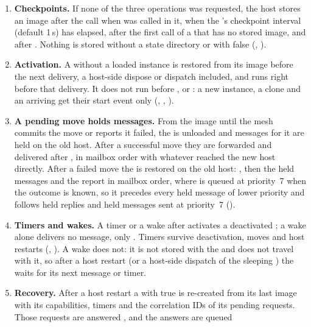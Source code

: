 \begin{enumerate}[leftmargin=2em]
  Images are taken only
  between calls, never while a call runs (; ABI
  section~4).
\item \textbf{Checkpoints.} If none of the three operations was requested,
  the host stores an image after the call when  was called
  in it, when the \paglet{}'s checkpoint interval (default 1\,s) has
  elapsed, after the first call of a \paglet{} that has no stored image,
  and after . Nothing is stored without a state
  directory or with  false (,
  ).
\item \textbf{Activation.} A \paglet{} without a loaded instance is restored
  from its image before the next delivery, a host-side dispose or dispatch
  included, and  runs right before that delivery. It
  does not run before ,  or : a new
  instance, a clone and an arriving \paglet{} get their start event only
  (, , ).
\item \textbf{A pending move holds messages.} From the image until the
  mesh commits the move or reports it failed, the \paglet{} is unloaded and
  messages for it are held on the old host. After a successful move they
  are forwarded and delivered after , in mailbox order
  with whatever reached the new host directly. After a failed move the
  \paglet{} is restored on the old host: , then the held
  messages and the report in mailbox order, where 
  is queued at priority~7 when the outcome is known, so it precedes every
  held message of lower priority and follows held replies and held messages
  sent at priority~7 ().
\item \textbf{Timers and wakes.} A timer or a wake after
   activates a deactivated \paglet{}; a wake alone
  delivers no message, only . Timers survive
  deactivation, moves and host restarts (, ).
  A wake does not: it is not stored with the \paglet{} and does not travel
  with it, so after a host restart (or a host-side dispatch of the sleeping
  \paglet{}) the \paglet{} waits for its next message or timer.
\item \textbf{Recovery.} After a host restart a \paglet{} with
   true is re-created from its last image with its
  capabilities, timers and the correlation IDs of its pending requests.
  Those requests are answered , and the answers are queued

\end{enumerate}
